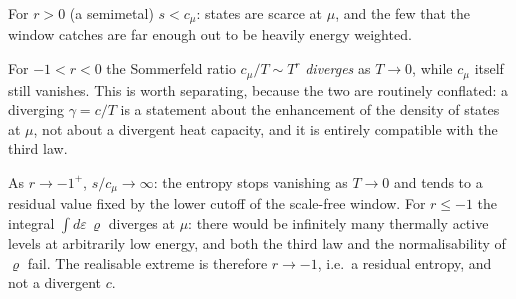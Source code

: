\documentclass[10pt,a4paper]{article}
\theoremstyle{plain}
\theoremstyle{remark}
\begin{document}
For $r>0$ (a semimetal) $s<c_\mu$: states are scarce at $\mu$, and the few that
the window catches are far enough out to be heavily energy weighted.

For $-1<r<0$ the Sommerfeld ratio $c_\mu/T\sim T^{r}$ \emph{diverges} as
$T\to0$, while $c_\mu$ itself still vanishes. This is worth separating, because
the two are routinely conflated: a diverging $\gamma=c/T$ is a statement about
the enhancement of the density of states at $\mu$, not about a divergent heat
capacity, and it is entirely compatible with the third law.

As $r\to-1^{+}$, $s/c_\mu\to\infty$: the entropy stops vanishing as $T\to0$ and
tends to a residual value fixed by the lower cutoff of the scale-free window.
For $r\le-1$ the integral $\int d\varepsilon\,\varrho$ diverges at $\mu$: there would
be infinitely many thermally active levels at arbitrarily low energy, and both
the third law and the normalisability of $\varrho$ fail. The realisable extreme is
therefore $r\to-1$, i.e.\ a residual entropy, and not a divergent $c$.
\end{document}
